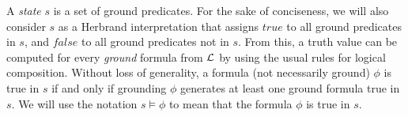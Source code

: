 \documentclass[letterpaper]{article} %
\begin{document}
A {\it state} $s$ is a set of ground predicates. For the sake of conciseness, we will also consider $s$ as a Herbrand interpretation that assigns $true$ to all ground predicates in $s$, and $false$ to all ground predicates not in $s$. From this, a truth value can be computed for every {\it ground} formula from ${\cal{L}}$ by using the usual rules for logical composition.
Without loss of generality, a formula (not necessarily ground) $\phi$ is true in $s$ if and only if grounding $\phi$ generates at least one ground formula true in $s$. We will use the notation $s \models \phi$ to mean that the formula $\phi$ is true in $s$.


\end{document}
